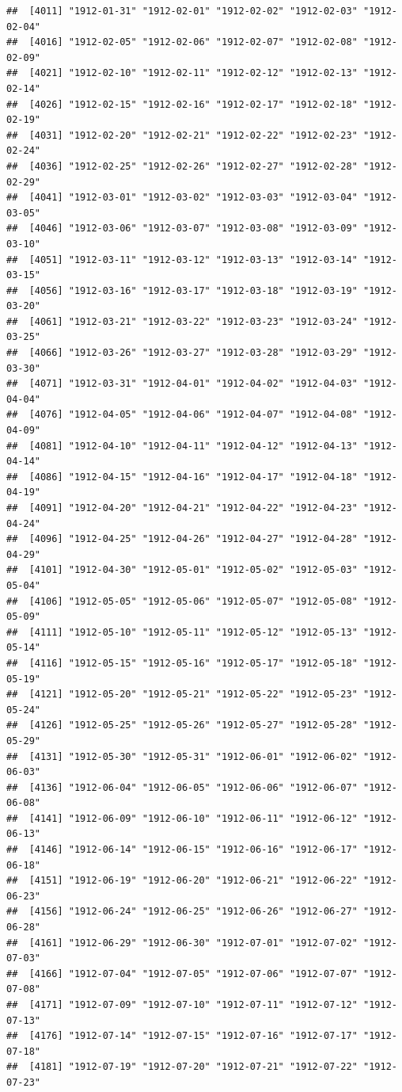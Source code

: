 \documentclass{article}\usepackage[]{graphicx}\usepackage[]{color}
\makeatletter
\newenvironment{kframe}{%
 \def\at@end@of@kframe{}%
 \ifinner\ifhmode%
  \def\at@end@of@kframe{\end{minipage}}%
  \begin{minipage}{\columnwidth}%
 \fi\fi%
 \def\FrameCommand##1{\hskip\@totalleftmargin \hskip-\fboxsep
 \colorbox{shadecolor}{##1}\hskip-\fboxsep
     \hskip-\linewidth \hskip-\@totalleftmargin \hskip\columnwidth}%
 \MakeFramed {\advance\hsize-\width
   \@totalleftmargin\z@ \linewidth\hsize
   \@setminipage}}%
 {\par\unskip\endMakeFramed%
 \at@end@of@kframe}
\newenvironment{knitrout}{}{} %
\makeatother
\begin{document}
\begin{description}
\begin{knitrout}
\begin{kframe}
\begin{verbatim}
##  [4011] "1912-01-31" "1912-02-01" "1912-02-02" "1912-02-03" "1912-02-04"
##  [4016] "1912-02-05" "1912-02-06" "1912-02-07" "1912-02-08" "1912-02-09"
##  [4021] "1912-02-10" "1912-02-11" "1912-02-12" "1912-02-13" "1912-02-14"
##  [4026] "1912-02-15" "1912-02-16" "1912-02-17" "1912-02-18" "1912-02-19"
##  [4031] "1912-02-20" "1912-02-21" "1912-02-22" "1912-02-23" "1912-02-24"
##  [4036] "1912-02-25" "1912-02-26" "1912-02-27" "1912-02-28" "1912-02-29"
##  [4041] "1912-03-01" "1912-03-02" "1912-03-03" "1912-03-04" "1912-03-05"
##  [4046] "1912-03-06" "1912-03-07" "1912-03-08" "1912-03-09" "1912-03-10"
##  [4051] "1912-03-11" "1912-03-12" "1912-03-13" "1912-03-14" "1912-03-15"
##  [4056] "1912-03-16" "1912-03-17" "1912-03-18" "1912-03-19" "1912-03-20"
##  [4061] "1912-03-21" "1912-03-22" "1912-03-23" "1912-03-24" "1912-03-25"
##  [4066] "1912-03-26" "1912-03-27" "1912-03-28" "1912-03-29" "1912-03-30"
##  [4071] "1912-03-31" "1912-04-01" "1912-04-02" "1912-04-03" "1912-04-04"
##  [4076] "1912-04-05" "1912-04-06" "1912-04-07" "1912-04-08" "1912-04-09"
##  [4081] "1912-04-10" "1912-04-11" "1912-04-12" "1912-04-13" "1912-04-14"
##  [4086] "1912-04-15" "1912-04-16" "1912-04-17" "1912-04-18" "1912-04-19"
##  [4091] "1912-04-20" "1912-04-21" "1912-04-22" "1912-04-23" "1912-04-24"
##  [4096] "1912-04-25" "1912-04-26" "1912-04-27" "1912-04-28" "1912-04-29"
##  [4101] "1912-04-30" "1912-05-01" "1912-05-02" "1912-05-03" "1912-05-04"
##  [4106] "1912-05-05" "1912-05-06" "1912-05-07" "1912-05-08" "1912-05-09"
##  [4111] "1912-05-10" "1912-05-11" "1912-05-12" "1912-05-13" "1912-05-14"
##  [4116] "1912-05-15" "1912-05-16" "1912-05-17" "1912-05-18" "1912-05-19"
##  [4121] "1912-05-20" "1912-05-21" "1912-05-22" "1912-05-23" "1912-05-24"
##  [4126] "1912-05-25" "1912-05-26" "1912-05-27" "1912-05-28" "1912-05-29"
##  [4131] "1912-05-30" "1912-05-31" "1912-06-01" "1912-06-02" "1912-06-03"
##  [4136] "1912-06-04" "1912-06-05" "1912-06-06" "1912-06-07" "1912-06-08"
##  [4141] "1912-06-09" "1912-06-10" "1912-06-11" "1912-06-12" "1912-06-13"
##  [4146] "1912-06-14" "1912-06-15" "1912-06-16" "1912-06-17" "1912-06-18"
##  [4151] "1912-06-19" "1912-06-20" "1912-06-21" "1912-06-22" "1912-06-23"
##  [4156] "1912-06-24" "1912-06-25" "1912-06-26" "1912-06-27" "1912-06-28"
##  [4161] "1912-06-29" "1912-06-30" "1912-07-01" "1912-07-02" "1912-07-03"
##  [4166] "1912-07-04" "1912-07-05" "1912-07-06" "1912-07-07" "1912-07-08"
##  [4171] "1912-07-09" "1912-07-10" "1912-07-11" "1912-07-12" "1912-07-13"
##  [4176] "1912-07-14" "1912-07-15" "1912-07-16" "1912-07-17" "1912-07-18"
##  [4181] "1912-07-19" "1912-07-20" "1912-07-21" "1912-07-22" "1912-07-23"

\end{verbatim}
\end{kframe}
\end{knitrout}
\end{description}
\end{document}
